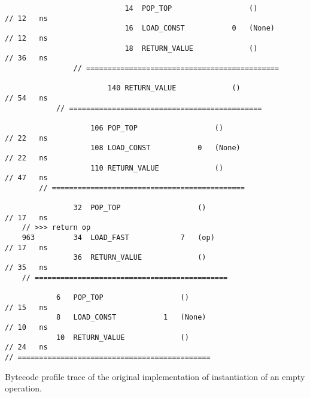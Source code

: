 \begin{code}
\begin{verbatim}
                            14  POP_TOP                  ()                                         // 12   ns
                            16  LOAD_CONST           0   (None)                                     // 12   ns
                            18  RETURN_VALUE             ()                                         // 36   ns
                // =============================================

                        140 RETURN_VALUE             ()                                             // 54   ns
            // =============================================

                    106 POP_TOP                  ()                                                 // 22   ns
                    108 LOAD_CONST           0   (None)                                             // 22   ns
                    110 RETURN_VALUE             ()                                                 // 47   ns
        // =============================================

                32  POP_TOP                  ()                                                     // 17   ns
    // >>> return op
    963         34  LOAD_FAST            7   (op)                                                   // 17   ns
                36  RETURN_VALUE             ()                                                     // 35   ns
    // =============================================

            6   POP_TOP                  ()                                                         // 15   ns
            8   LOAD_CONST           1   (None)                                                     // 10   ns
            10  RETURN_VALUE             ()                                                         // 24   ns
// =============================================
    \end{verbatim}
    \caption{Bytecode profile trace of the original implementation of instantiation of an empty operation.}
    \label{listing:bytecode-profiles-hastrait-original}
\end{code}


